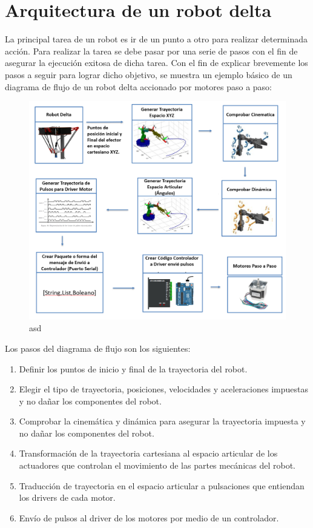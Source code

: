 \chapter{Arquitectura de un robot delta}\label{CAP3}

La principal tarea de un robot es ir de un punto a otro para realizar determinada acción. Para realizar la tarea se debe pasar por una serie de pasos con el fin de asegurar la ejecución exitosa de dicha tarea. Con el fin de explicar brevemente los pasos a seguir para lograr dicho objetivo, se muestra un ejemplo básico de un diagrama de flujo de un robot delta accionado por motores paso a paso:

    \begin{figure}[htb]
        \centering
        \includegraphics[width=0.8\linewidth]{Main/Chapter3/Images3/3-1/diagrama-de-flujo-robot.png}
        \caption{asd}
        \label{f:Cap3-1_diagrama_de_flujo_robot_accion}
    \end{figure}
    
Los pasos del diagrama de flujo son los siguientes:

\begin{enumerate}
    \item Definir los puntos de inicio y final de la trayectoria del robot.
    \item Elegir el tipo de trayectoria, posiciones, velocidades y aceleraciones impuestas y no dañar los componentes del robot.
    \item Comprobar la cinemática y dinámica para asegurar la trayectoria impuesta y no dañar los componentes del robot.
    \item Transformación de la trayectoria cartesiana al espacio articular de los actuadores que controlan el movimiento de las partes mecánicas del robot.
    \item Traducción de trayectoria en el espacio articular a pulsaciones que entiendan los drivers de cada motor.
    \item Envío de pulsos al driver de los motores por medio de un controlador.
\end{enumerate}

